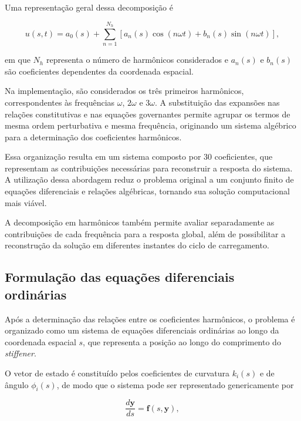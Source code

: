 \documentclass[arial,centeredequations,english,brazilian,oneside,section=TITLE]{ifes8}
\begin{document}
Uma representação geral dessa decomposição é

\begin{equation}
  u(s,t) =
  a_0(s) +
  \sum_{n=1}^{N_h}
  \left[
    a_n(s)\cos(n\omega t) +
    b_n(s)\sin(n\omega t)
  \right],
  \label{eq:expansao-harmonica}
\end{equation}

em que $N_h$ representa o número de harmônicos considerados e
$a_n(s)$ e $b_n(s)$ são coeficientes dependentes da coordenada
espacial.

Na implementação, são considerados os três primeiros harmônicos,
correspondentes às frequências $\omega$, $2\omega$ e $3\omega$.
A substituição das expansões nas relações constitutivas e nas
equações governantes permite agrupar os termos de mesma ordem
perturbativa e mesma frequência, originando um sistema algébrico
para a determinação dos coeficientes harmônicos.

Essa organização resulta em um sistema composto por 30 coeficientes,
que representam as contribuições necessárias para reconstruir a
resposta do sistema. A utilização dessa abordagem reduz o problema
original a um conjunto finito de equações diferenciais e relações
algébricas, tornando sua solução computacional mais viável.

A decomposição em harmônicos também permite avaliar separadamente
as contribuições de cada frequência para a resposta global, além de
possibilitar a reconstrução da solução em diferentes instantes do
ciclo de carregamento.

\subsection{Formulação das equações diferenciais ordinárias}
\label{subsec:formulacao-edo}

Após a determinação das relações entre os coeficientes harmônicos,
o problema é organizado como um sistema de equações diferenciais
ordinárias ao longo da coordenada espacial $s$, que representa a
posição ao longo do comprimento do \textit{stiffener}.

O vetor de estado é constituído pelos coeficientes de curvatura
$k_i(s)$ e de ângulo $\phi_i(s)$, de modo que o sistema pode ser
representado genericamente por

\begin{equation}
  \frac{d\mathbf{y}}{ds}
  =
  \mathbf{f}(s,\mathbf{y}),
  \label{eq:sistema-edo}
\end{equation}
\end{document}
